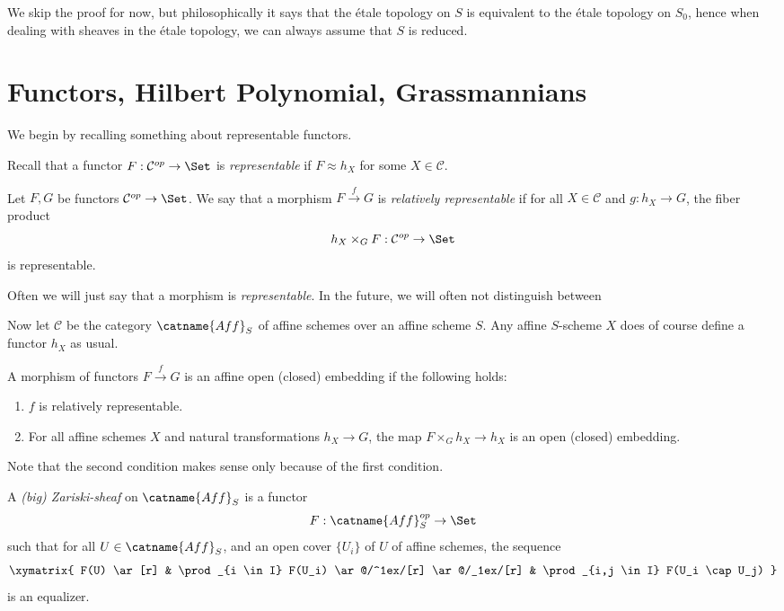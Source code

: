 \documentclass[11pt, english]{article}
\begin{document}
We skip the proof for now, but philosophically it says that the étale topology on $S$ is equivalent to the étale topology on $S_0$, hence when dealing with sheaves in the étale topology, we can always assume that $S$ is reduced.

\pagebreak
\section{Functors, Hilbert Polynomial, Grassmannians}

We begin by recalling something about representable functors.

Recall that a functor $F:\mathcal C^{op} \to  \Set$ is \emph{representable} if $F \approx h_X$ for some $X \in \mathcal C$.

\begin{defi}
Let $F,G$ be functors $\mathcal C^{op} \to \Set$. We say that a morphism $F \xrightarrow{f} G$ is \emph{relatively representable} if for all $X \in \mathcal C$ and $g:h_X \to G$, the fiber product
\[
h_X \times _G F: \mathcal C^{op} \to \Set
\]
is representable.
\end{defi}

Often we will just say that a morphism is \emph{representable}. In the future, we will often not distinguish between 

Now let $\mathcal C$ be the category $\catname{Aff}_S$ of affine schemes over an affine scheme $S$. Any affine $S$-scheme $X$ does of course define a functor $h_X$ as usual.

\begin{defi}
A morphism of functors $F \xrightarrow{f} G$ is an affine open (closed) embedding if the following holds: 
\begin{enumerate}
\item $f$ is relatively representable.
\item For all affine schemes $X$ and natural transformations $h_X \to G$, the map $F \times_G h_X \to h_X$ is an open (closed) embedding.
\end{enumerate}
\end{defi}
Note that the second condition makes sense only because of the first condition. 

\begin{defi}A \emph{(big) Zariski-sheaf} on $\catname{Aff}_S$ is a functor
\[
F:\catname{Aff}_S^{op} \to \Set
\]
such that for all $U \in \catname{Aff}_S$, and an open cover $\{U_i\}$ of $U$ of affine schemes, the sequence
\[
\xymatrix{
F(U) \ar[r] &  \prod_{i \in I} F(U_i) \ar@/^1ex/[r] \ar@/_1ex/[r]  & \prod_{i,j \in I} F(U_i \cap U_j)
}
\]
is an equalizer.
\end{defi}
\end{document}
